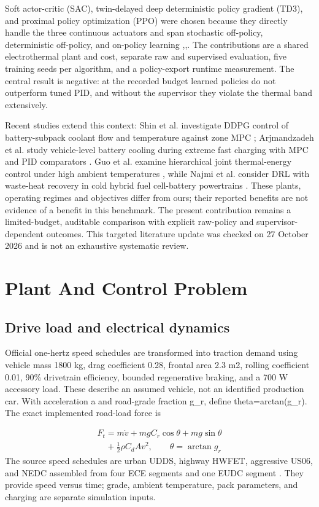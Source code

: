 \documentclass[conference]{IEEEtran}
\begin{document}
Soft actor-critic (SAC), twin-delayed deep deterministic policy gradient (TD3), and proximal policy optimization (PPO) were chosen because they directly handle the three continuous actuators and span stochastic off-policy, deterministic off-policy, and on-policy learning \cite{r3},\cite{r4},\cite{r5}. The contributions are a shared electrothermal plant and cost, separate raw and supervised evaluation, five training seeds per algorithm, and a policy-export runtime measurement. The central result is negative: at the recorded budget learned policies do not outperform tuned PID, and without the supervisor they violate the thermal band extensively.

Recent studies extend this context: Shin et al. investigate DDPG control of battery-subpack coolant flow and temperature against zone MPC \cite{r6}; Arjmandzadeh et al. study vehicle-level battery cooling during extreme fast charging with MPC and PID comparators \cite{r7}. Guo et al. examine hierarchical joint thermal-energy control under high ambient temperatures \cite{r8}, while Najmi et al. consider DRL with waste-heat recovery in cold hybrid fuel cell-battery powertrains \cite{r9}. These plants, operating regimes and objectives differ from ours; their reported benefits are not evidence of a benefit in this benchmark. The present contribution remains a limited-budget, auditable comparison with explicit raw-policy and supervisor-dependent outcomes. This targeted literature update was checked on 27 October 2026 and is not an exhaustive systematic review.

\section{Plant And Control Problem}
\subsection{Drive load and electrical dynamics}
Official one-hertz speed schedules are transformed into traction demand using vehicle mass 1800 kg, drag coefficient 0.28, frontal area 2.3 m2, rolling coefficient 0.01, 90\% drivetrain efficiency, bounded regenerative braking, and a 700 W accessory load. These describe an assumed vehicle, not an identified production car. With acceleration a and road-grade fraction g\_r, define theta=arctan(g\_r). The exact implemented road-load force is

\begin{equation}
\begin{gathered}F_t=m\dot v+mgC_r\cos\theta+mg\sin\theta\\\quad+\frac{1}{2}\rho C_d A v^2,\qquad\theta=\arctan g_r\end{gathered}
\label{eq:1}
\end{equation}
The source speed schedules are urban UDDS, highway HWFET, aggressive US06, and NEDC assembled from four ECE segments and one EUDC segment \cite{r10}. They provide speed versus time; grade, ambient temperature, pack parameters, and charging are separate simulation inputs.
\end{document}
